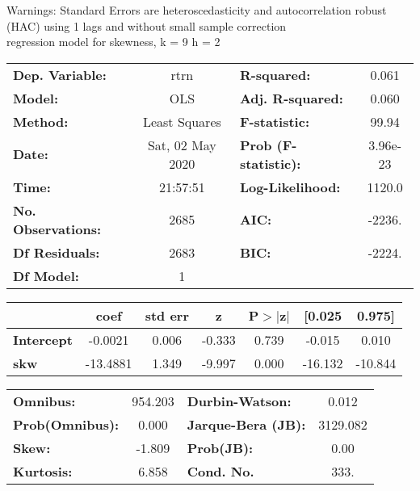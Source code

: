 Warnings: \newline
 [1] Standard Errors are heteroscedasticity and autocorrelation robust (HAC) using 1 lags and without small sample correction\\ 

regression model for skewness, k = 9 h = 2\begin{center}
\begin{tabular}{lclc}
\toprule
\textbf{Dep. Variable:}    &       rtrn       & \textbf{  R-squared:         } &     0.061   \\
\textbf{Model:}            &       OLS        & \textbf{  Adj. R-squared:    } &     0.060   \\
\textbf{Method:}           &  Least Squares   & \textbf{  F-statistic:       } &     99.94   \\
\textbf{Date:}             & Sat, 02 May 2020 & \textbf{  Prob (F-statistic):} &  3.96e-23   \\
\textbf{Time:}             &     21:57:51     & \textbf{  Log-Likelihood:    } &    1120.0   \\
\textbf{No. Observations:} &        2685      & \textbf{  AIC:               } &    -2236.   \\
\textbf{Df Residuals:}     &        2683      & \textbf{  BIC:               } &    -2224.   \\
\textbf{Df Model:}         &           1      & \textbf{                     } &             \\
\bottomrule
\end{tabular}
\begin{tabular}{lcccccc}
                   & \textbf{coef} & \textbf{std err} & \textbf{z} & \textbf{P$> |$z$|$} & \textbf{[0.025} & \textbf{0.975]}  \\
\midrule
\textbf{Intercept} &      -0.0021  &        0.006     &    -0.333  &         0.739        &       -0.015    &        0.010     \\
\textbf{skw}       &     -13.4881  &        1.349     &    -9.997  &         0.000        &      -16.132    &      -10.844     \\
\bottomrule
\end{tabular}
\begin{tabular}{lclc}
\textbf{Omnibus:}       & 954.203 & \textbf{  Durbin-Watson:     } &    0.012  \\
\textbf{Prob(Omnibus):} &   0.000 & \textbf{  Jarque-Bera (JB):  } & 3129.082  \\
\textbf{Skew:}          &  -1.809 & \textbf{  Prob(JB):          } &     0.00  \\
\textbf{Kurtosis:}      &   6.858 & \textbf{  Cond. No.          } &     333.  \\
\bottomrule
\end{tabular}
\end{center}

